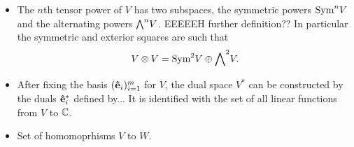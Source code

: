 \begin{itemize}
			\item The $n$th tensor power of $V$ has two subspaces, the symmetric powers $\text{Sym}^n V$ and the alternating powers ${\bigwedge}^n V$. EEEEEH further definition?? In particular the symmetric and exterior squares are such that
			\begin{align*}
				V \otimes V = \text{Sym}^2 V \oplus {\bigwedge}^2 V.
			\end{align*}
			
			\item After fixing the basis $(\mathbf{\hat{e}}_i)_{i=1}^m$ for $V$, the dual space $V^*$ can be constructed by the duals $\mathbf{\hat{e}}_i^*$ defined by... It is identified with the set of all linear functions from $V$ to $\mathbb{C}$.
			
			\item Set of homomoprhisms $V$ to $W$.
			
		\end{itemize} 
		
	

		
		
		